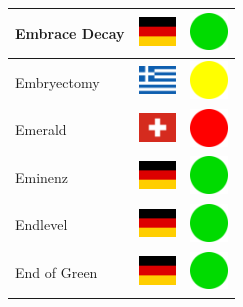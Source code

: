 \documentclass[12pt, a4paper, twoside]{report}
\begin{document}
\begin{center}
\begin{longtable}{|p{5cm}|p{2cm}|p{2cm}|}
			Embrace Decay & \includegraphics[width=1cm]{4x3/de} & \includegraphics[width=1cm]{likes/y} \\ \hline
			Embryectomy & \includegraphics[width=1cm]{4x3/gr} & \includegraphics[width=1cm]{likes/m} \\ \hline
			Emerald & \includegraphics[width=1cm]{4x3/ch} & \includegraphics[width=1cm]{likes/n} \\ \hline
			Eminenz & \includegraphics[width=1cm]{4x3/de} & \includegraphics[width=1cm]{likes/y} \\ \hline
			Endlevel & \includegraphics[width=1cm]{4x3/de} & \includegraphics[width=1cm]{likes/y} \\ \hline
			End of Green & \includegraphics[width=1cm]{4x3/de} & \includegraphics[width=1cm]{likes/y} \\ \hline

\end{longtable}
\end{center}
\end{document}
